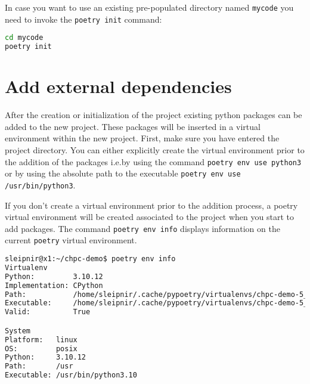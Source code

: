 \documentclass[10pt]{article}
\begin{document}
In case you want to use an existing pre-populated directory named \texttt{mycode} you need to invoke the \lstinline[language=bash]{poetry init} command:
\begin{lstlisting}[language=bash]
cd mycode
poetry init
\end{lstlisting}

\section{Add external dependencies}
After the creation or initialization of the project existing python packages can be added to the new project.
These packages will be inserted in a virtual environment within the new project. First, make sure you have entered 
the project directory.
You can either explicitly create the virtual environment prior to the addition of the packages i.e.\;by using the 
command \lstinline[language=bash]{poetry env use python3} or by using the absolute path to the executable \lstinline[language=bash]{poetry env use /usr/bin/python3}.

If you don't create a virtual environment prior to the addition process, a poetry virtual environment 
will be created associated to the project when you start to add packages.
The command \lstinline[language=bash]{poetry env info} displays information on the current \lstinline[language=bash]{poetry} virtual environment.
\begin{lstlisting}[language=bash]
sleipnir@x1:~/chpc-demo$ poetry env info
Virtualenv
Python:         3.10.12
Implementation: CPython
Path:           /home/sleipnir/.cache/pypoetry/virtualenvs/chpc-demo-5_MZDma8-py3.10
Executable:     /home/sleipnir/.cache/pypoetry/virtualenvs/chpc-demo-5_MZDma8-py3.10/bin/python
Valid:          True

System
Platform:   linux
OS:         posix
Python:     3.10.12
Path:       /usr
Executable: /usr/bin/python3.10
\end{lstlisting}
\end{document}

